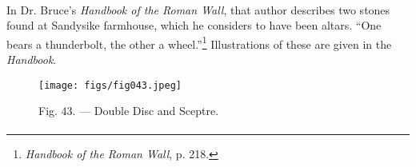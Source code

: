 \documentclass[a4paper, 11pt, oneside, polutonikogreek, english]{article}
\begin{document}
\paragraph{}
In Dr. Bruce's \emph{Handbook of the Roman Wall}, that author describes two stones found at Sandysike farmhouse, which he considers to have been altars. ``One bears a thunderbolt, the other a wheel.''\footnote{\emph{Handbook of the Roman Wall}, p. 218.} Illustrations of these are given in the \emph{Handbook}.

\begin{figure}[H]
\centering
\texttt{[image: figs/fig043.jpeg]}
\caption{Fig. 43. --- Double Disc and Sceptre.}
\end{figure}
\paragraph{}
\end{document}
